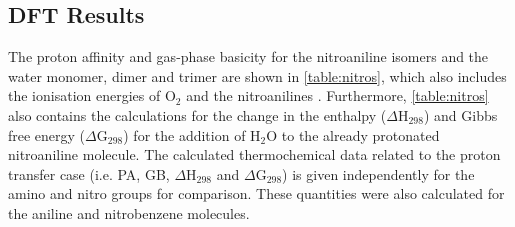 \subsection{DFT Results}
The proton affinity and gas-phase basicity for the nitroaniline isomers and the water monomer, dimer and trimer are shown in \autoref{table:nitros}, which also includes the ionisation energies of O$_2$ and the nitroanilines \cite{linstrom2015nist}. 
Furthermore, \autoref{table:nitros} also contains the calculations for the change in the enthalpy ($\Delta$H$_{298}$)  and Gibbs free energy ($\Delta$G$_{298}$) for the addition of H$_2$O to the already protonated nitroaniline molecule.
The calculated thermochemical data related to the proton transfer case (i.e. PA, GB, $\Delta$H$_{298}$ and $\Delta$G$_{298}$) is given independently for the amino and nitro groups for comparison. 
These quantities were also calculated for the aniline and nitrobenzene molecules.



